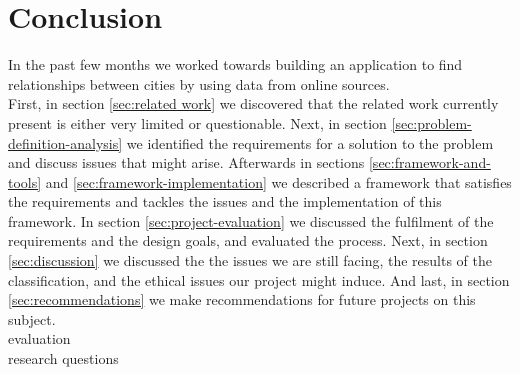 \chapter{Conclusion}
In the past few months we worked towards building an application to find relationships between cities by using data from online sources.  \\


First, in section \ref{sec:related work} we discovered that the related work currently present is either very limited or questionable. Next, in section \ref{sec:problem-definition-analysis} we identified the requirements for a solution to the problem and discuss issues that might arise. Afterwards in sections \ref{sec:framework-and-tools} and \ref{sec:framework-implementation} we described a framework that satisfies the requirements and tackles the issues and the implementation of this framework. In section \ref{sec:project-evaluation} we discussed the fulfilment of the requirements and the design goals, and evaluated the process. Next, in section \ref{sec:discussion} we discussed the the issues we are still facing, the results of the classification, and the ethical issues our project might induce. And last, in section \ref{sec:recommendations} we make recommendations for future projects on this subject. \\

evaluation \\

research questions \\










